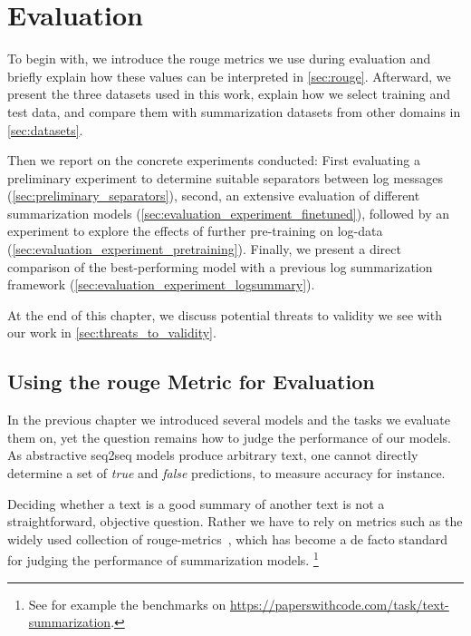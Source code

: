 \chapter{Evaluation}\label{ch:evaluation}


To begin with, we introduce the \acs*{rouge} metrics we use during evaluation
and briefly explain how these values can be interpreted in \autoref{sec:rouge}.
Afterward, we present the three datasets used in this work,
explain how we select training and test data,
and compare them with summarization datasets from other domains in \autoref{sec:datasets}.

Then we report on the concrete experiments conducted:
First evaluating a preliminary experiment to determine suitable separators between log messages (\autoref{sec:preliminary_separators}),
second, an extensive evaluation of different summarization models (\autoref{sec:evaluation_experiment_finetuned}),
followed by an experiment to explore the effects of further pre-training on log-data (\autoref{sec:evaluation_experiment_pretraining}).
Finally, we present a direct comparison of the best-performing model with a previous log summarization framework (\autoref{sec:evaluation_experiment_logsummary}).

At the end of this chapter, we discuss potential threats to validity we see with our work in \autoref{sec:threats_to_validity}.

\section{Using the \acs*{rouge} Metric for Evaluation}\label{sec:rouge}

In the previous chapter we introduced several models and the tasks we evaluate them on,
yet the question remains how to judge the performance of our models.
As abstractive \ac{seq2seq} models produce arbitrary text,
one cannot directly determine a set of \emph{true} and \emph{false} predictions,
to measure accuracy for instance.

Deciding whether a text is a good summary of another text is not a straightforward, objective question.
Rather we have to rely on metrics such as the widely used collection of \acs*{rouge}-metrics~\parencite{rouge},
which has become a de facto standard for judging the performance of summarization models.%
\footnote{See for example the benchmarks on \url{https://paperswithcode.com/task/text-summarization}.}


